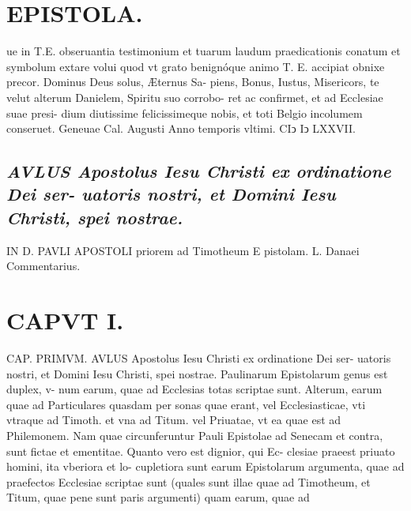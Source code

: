 \documentclass{article}
\begin{document}
\begin{pages}
\section*{EPISTOLA. }\pstart ue in T.E. obseruantia testimonium et tuarum laudum praedicationis conatum et symbolum extare volui quod vt grato benignóque animo T. E. accipiat obnixe precor. Dominus Deus solus, Æternus Sa- piens, Bonus, Iustus, Misericors, te velut alterum Danielem, Spiritu suo corrobo- ret ac confirmet, et ad Ecclesiae suae presi- dium diutissime felicissimeque nobis, et toti Belgio incolumem conseruet. Geneuae Cal. Augusti Anno temporis vltimi. CIↄ Iↄ LXXVII.  \pend\pstart {}
{}
\subsection*{\textit{AVLUS Apostolus Iesu Christi ex ordinatione Dei ser- uatoris nostri, et Domini Iesu Christi, spei nostrae.}}IN D. PAVLI APOSTOLI priorem ad Timotheum E pistolam. L. Danaei Commentarius.
\section{CAPVT  I. } CAP. PRIMVM. AVLUS Apostolus Iesu Christi ex ordinatione Dei ser- uatoris nostri, et Domini Iesu Christi, spei nostrae.  \pend\pstart Paulinarum Epistolarum genus est duplex, v- num earum, quae ad Ecclesias totas scriptae sunt. Alterum, earum quae ad Particulares quasdam per sonas quae erant, vel Ecclesiasticae, vti vtraque ad Timoth. et vna ad Titum. vel Priuatae, vt ea quae est ad Philemonem. Nam quae circunferuntur Pauli Epistolae ad Senecam et contra, sunt fictae et ementitae. Quanto vero est dignior, qui Ec- clesiae praeest priuato homini, ita vberiora et lo- cupletiora sunt earum Epistolarum argumenta, quae ad praefectos Ecclesiae scriptae sunt (quales sunt illae quae ad Timotheum, et Titum, quae pene sunt paris argumenti) quam earum, quae ad  \pend
\textbf{}

\end{pages}
\end{document}

